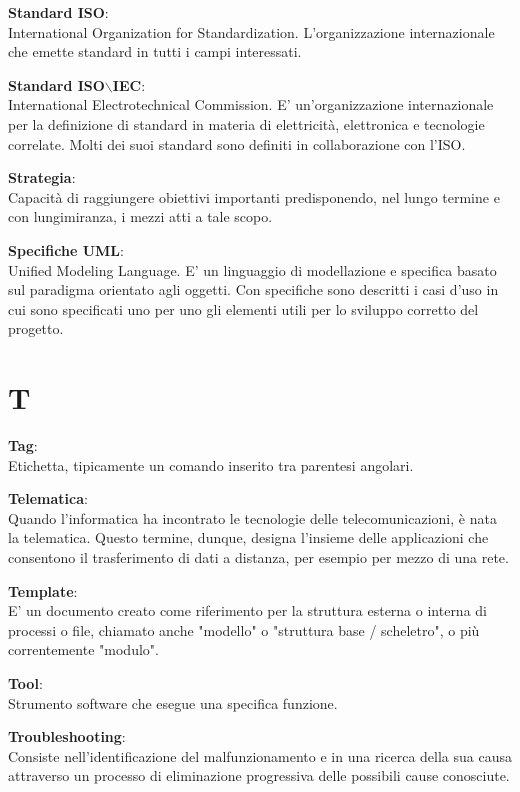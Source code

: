 \documentclass[a4paper, oneside, openany, dvipsnames, table]{article}
\begin{document}
\textbf{Standard ISO}:\\	International Organization for Standardization. L'organizzazione internazionale che emette standard in tutti i campi interessati.

\textbf{Standard ISO$\backslash$IEC}:\\	International Electrotechnical Commission. E' un'organizzazione internazionale per la definizione di standard in materia di elettricità, elettronica e tecnologie correlate. Molti dei suoi standard sono definiti in collaborazione con l'ISO.

\textbf{Strategia}:\\Capacità di raggiungere obiettivi importanti predisponendo, nel lungo termine e con lungimiranza, i mezzi atti a tale scopo.

\textbf{Specifiche UML}:\\	Unified Modeling Language. E' un linguaggio di modellazione e specifica basato sul paradigma orientato agli oggetti. Con specifiche  sono descritti i casi d'uso in cui sono specificati uno per uno gli elementi utili per lo sviluppo corretto del progetto.


\newpage
\section{T}
\textbf{Tag}:\\		Etichetta, tipicamente un comando inserito tra parentesi angolari.

\textbf{Telematica}:\\	 Quando l'informatica ha incontrato le tecnologie delle telecomunicazioni, è nata la telematica. Questo termine, dunque, designa l'insieme delle applicazioni che consentono il trasferimento di dati a distanza, per esempio per mezzo di una rete. 

\textbf{Template}:\\ E' un documento creato come riferimento per la struttura esterna o interna di processi o file, chiamato anche "modello" o "struttura base / scheletro", o più correntemente "modulo".

\textbf{Tool}:\\	Strumento software che esegue una specifica funzione.

\textbf{Troubleshooting}:\\	Consiste nell'identificazione del malfunzionamento e in una ricerca della sua causa attraverso un processo di eliminazione progressiva delle possibili cause conosciute.


\newpage
\end{document}
